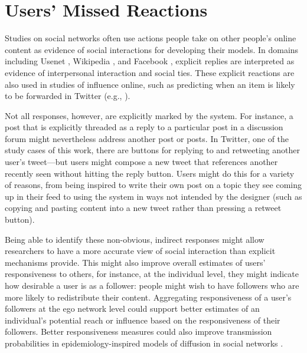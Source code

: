 \section{Users' Missed Reactions}

Studies on social networks often use actions people take on other people's online content as evidence of social interactions for developing their models. In domains including Usenet \cite{Joyce2006}, Wikipedia \cite{Black2011}, and Facebook \cite{Gilbert2009}, explicit replies are interpreted as evidence of interpersonal interaction and social ties.  These explicit reactions are also used in studies of influence online, such as predicting when an item is likely to be forwarded in Twitter (e.g., \cite{Suh2010,Comarela2012}).

Not all responses, however, are explicitly marked by the system.  For instance, a post that is explicitly threaded as a reply to a particular post in a discussion forum might nevertheless address another post or posts.  In Twitter, one of the study cases of this work, there are buttons for replying to and retweeting another user's tweet---but users might compose a new tweet that references another recently seen without hitting the reply button.  Users might do this for a variety of reasons, from being inspired to write their own post on a topic they see coming up in their feed to using the system in ways not intended by the designer (such as copying and pasting content into a new tweet rather than pressing a retweet button).  

Being able to identify these non-obvious, indirect responses might allow researchers to have a more accurate view of social interaction than explicit mechanisms provide.  This might also improve overall estimates of users' responsiveness to others, for instance,
at the individual level, they might indicate how desirable a user is as a follower: people might wish to have followers who are more likely to redistribute their content.  Aggregating responsiveness of a user's followers at the ego network level could support better estimates of an individual's potential reach or influence \cite{Domingos2001} based on the responsiveness of their followers.  Better responsiveness measures could also improve transmission probabilities in epidemiology-inspired models of diffusion in social networks \cite{Bakshy2012a}. 

